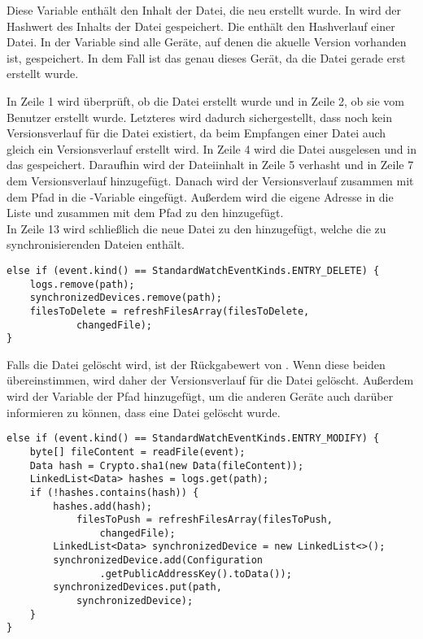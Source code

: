 \begin{description}
	Diese Variable enthält den Inhalt der Datei, die neu erstellt wurde.
	In  wird der Hashwert des Inhalts der Datei gespeichert.
	Die  enthält den Hashverlauf einer Datei. 
	In der Variable  sind alle Geräte, auf denen die akuelle Version vorhanden ist, gespeichert. In dem Fall ist das genau dieses Gerät, da die Datei gerade erst erstellt wurde.
\end{description}
In Zeile 1 wird überprüft, ob die Datei erstellt wurde und in Zeile 2, ob sie vom Benutzer erstellt wurde. Letzteres wird dadurch sichergestellt, dass noch kein Versionsverlauf für die Datei existiert, da beim Empfangen einer Datei auch gleich ein Versionsverlauf erstellt wird. In Zeile 4 wird die Datei ausgelesen und in das  gespeichert. Daraufhin wird der Dateiinhalt in Zeile 5 verhasht und in Zeile 7 dem Versionsverlauf hinzugefügt. Danach wird der Versionsverlauf zusammen mit dem Pfad in die -Variable eingefügt. Außerdem wird die eigene Adresse in die Liste  und zusammen mit dem Pfad zu den  hinzugefügt. \\
In Zeile 13 wird schließlich die neue Datei zu den  hinzugefügt, welche die zu synchronisierenden Dateien enthält.
\javalisting
\begin{minipage}{\linewidth}
\begin{lstlisting}[caption={Erkennen eines Konflikts},captionpos=b]
else if (event.kind() == StandardWatchEventKinds.ENTRY_DELETE) {
	logs.remove(path);
	synchronizedDevices.remove(path);
	filesToDelete = refreshFilesArray(filesToDelete,
			changedFile);
}
\end{lstlisting}
\end{minipage}
Falls die Datei gelöscht wird, ist der Rückgabewert von . Wenn diese beiden übereinstimmen, wird daher der Versionsverlauf für die Datei gelöscht. Außerdem wird der Variable  der Pfad hinzugefügt, um die anderen Geräte auch darüber informieren zu können, dass eine Datei gelöscht wurde.
\javalisting
\begin{minipage}{\linewidth}
\begin{lstlisting}[caption={Erkennen eines Konflikts},captionpos=b]
else if (event.kind() == StandardWatchEventKinds.ENTRY_MODIFY) {
	byte[] fileContent = readFile(event);
	Data hash = Crypto.sha1(new Data(fileContent));
	LinkedList<Data> hashes = logs.get(path);
	if (!hashes.contains(hash)) {
		hashes.add(hash);
			filesToPush = refreshFilesArray(filesToPush,
				changedFile);
		LinkedList<Data> synchronizedDevice = new LinkedList<>();
		synchronizedDevice.add(Configuration
				.getPublicAddressKey().toData());
		synchronizedDevices.put(path,
			synchronizedDevice);
	}
}
\end{lstlisting}
\end{minipage}
